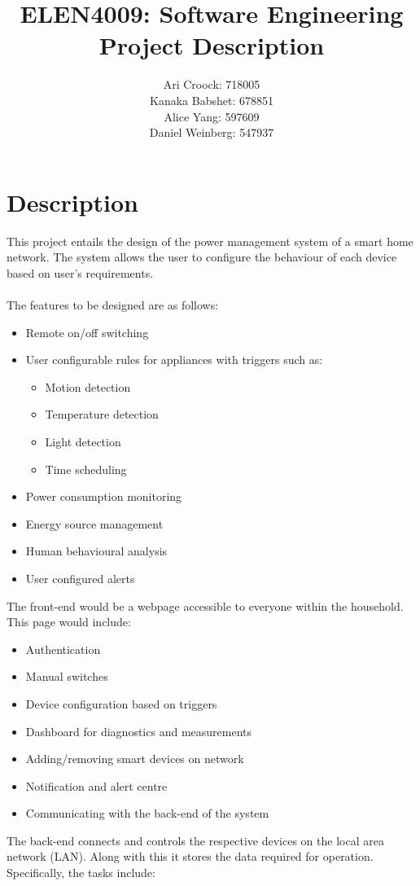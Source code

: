 \documentclass[paper=a4, onecolumn, fontsize=11pt]{scrartcl} %
\title{\vspace{-7mm}ELEN4009: Software Engineering
\\ Project Description}
\date{\vspace{-5ex}}
\author{Ari Croock: 718005\\Kanaka Babshet: 678851\\Alice Yang: 597609\\Daniel Weinberg: 547937}
\begin{document}
	
	\maketitle
	\vspace{-7mm}
	
	\section{Description}
	
	This project entails the design of the power management system of a smart home network. The system allows the user to configure the behaviour of each device based on user's requirements. 
	\\\\
	The features to be designed are as follows:
	\begin{itemize}
		\item Remote on/off switching
		\item User configurable rules for appliances with triggers such as:
		\begin{itemize}
			\item Motion detection
			\item Temperature detection
			\item Light detection
			\item Time scheduling 
		\end{itemize}
		\item Power consumption monitoring
		\item Energy source management
		\item Human behavioural analysis
		\item User configured alerts
	\end{itemize}
	
	The front-end would be a webpage accessible to everyone within the household. This page would include:
	\begin{itemize}
		\item Authentication
		\item Manual switches
		\item Device configuration based on triggers
		\item Dashboard for diagnostics and measurements
		\item Adding/removing smart devices on network
		\item Notification and alert centre
		\item Communicating with the back-end of the system
	\end{itemize}
	The back-end connects and controls the respective devices on the local area network (LAN). Along with this it stores the data required for operation. Specifically, the tasks include: 
	
\end{document}
